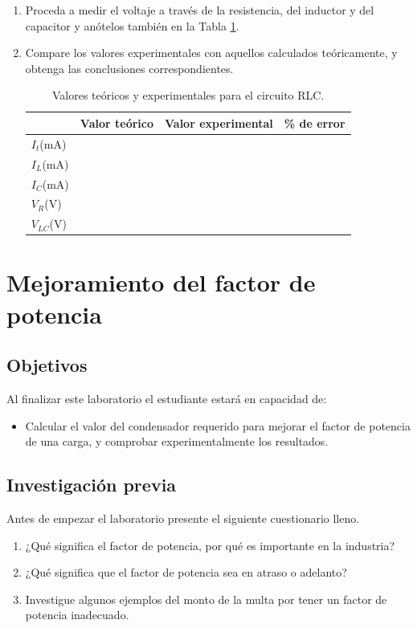 \documentclass[12pt,letterpaper]{report}
\newcommand{\obj}{Objetivos}
\newcommand{\inv}{Investigación previa}
\newcommand{\capacidad}{Al finalizar este laboratorio el estudiante estará en capacidad de:}
\newcommand{\antesde}{Antes de empezar el laboratorio presente el siguiente cuestionario lleno.}
\begin{document}
\begin{enumerate}
\emph{Nota:} Asegúrese de apagar el generador de audio cada vez que cambie la ubicación del multímetro digital.
\item Proceda a medir el voltaje a través de la resistencia, del inductor y del capacitor y anótelos también en la Tabla \ref{tab:L11T2}.
\item Compare los valores experimentales con aquellos calculados teóricamente, y obtenga las conclusiones correspondientes.

\begin{table}[H]
	\caption{Valores teóricos y experimentales para el circuito RLC.}
	\label{tab:L11T2}
	\centering
	\begin{tabularx}{14cm}{lXXX}
		\toprule
		& Valor teórico & Valor experimental & \% de error \\
		\midrule
		$I_{t}$(mA) & & & \\
		$I_{L}$(mA) & & & \\
		$I_{C}$(mA) & & & \\
		$V_{R}$(V) & & & \\
		$V_{LC}$(V) & & & \\
		\bottomrule
	\end{tabularx}
    
\end{table}
\end{enumerate}

\chapter{Mejoramiento del factor de potencia}
\section{\obj}
\capacidad
\begin{itemize}
\item Calcular el valor del condensador requerido para mejorar el factor de potencia de una carga, y comprobar experimentalmente los resultados.
\end{itemize}
\section{\inv}
\antesde
\begin{enumerate}
\item ¿Qué significa el factor de potencia, por qué es importante en la industria?
\item ¿Qué significa que el factor de potencia sea en atraso o adelanto?
\item Investigue algunos ejemplos del monto de la multa por tener un factor de potencia inadecuado.
\end{enumerate}
\end{document}

